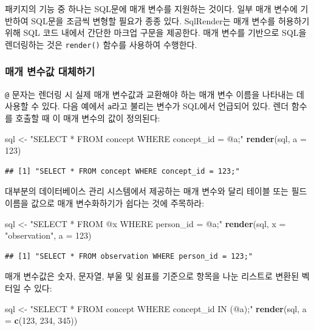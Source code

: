 \documentclass[10.5pt]{book}
\newenvironment{Shaded}{\begin{snugshade}}{\end{snugshade}}
\newcommand{\KeywordTok}[1]{\textcolor[rgb]{0.13,0.29,0.53}{\textbf{#1}}}
\newcommand{\DataTypeTok}[1]{\textcolor[rgb]{0.13,0.29,0.53}{#1}}
\newcommand{\DecValTok}[1]{\textcolor[rgb]{0.00,0.00,0.81}{#1}}
\newcommand{\StringTok}[1]{\textcolor[rgb]{0.31,0.60,0.02}{#1}}
\newcommand{\NormalTok}[1]{#1}
\theoremstyle{definition}
\theoremstyle{definition}
\theoremstyle{definition}
\theoremstyle{remark}
\begin{document}
패키지의 기능 중 하나는 SQL문에 매개 변수를 지원하는 것이다. 일부 매개
변수에 기반하여 SQL문을 조금씩 변형할 필요가 종종 있다. SqlRender는 매개
변수를 허용하기 위해 SQL 코드 내에서 간단한 마크업 구문을 제공한다. 매개
변수를 기반으로 SQL을 렌더링하는 것은 \texttt{render()} 함수를 사용하여
수행한다. 

\subsubsection*{매개 변수값 대체하기}\label{--}

\texttt{@} 문자는 렌더링 시 실제 매개 변수값과 교환해야 하는 매개 변수
이름을 나타내는 데 사용할 수 있다. 다음 예에서 \texttt{a}라고 불리는
변수가 SQL에서 언급되어 있다. 렌더 함수를 호출할 때 이 매개 변수의 값이
정의된다:

\begin{Shaded}
\begin{Highlighting}[]
\NormalTok{sql <-}\StringTok{ "SELECT * FROM concept WHERE concept_id = @a;"}
\KeywordTok{render}\NormalTok{(sql, }\DataTypeTok{a =} \DecValTok{123}\NormalTok{)}
\end{Highlighting}
\end{Shaded}

\begin{verbatim}
## [1] "SELECT * FROM concept WHERE concept_id = 123;"
\end{verbatim}

대부분의 데이터베이스 관리 시스템에서 제공하는 매개 변수와 달리 테이블
또는 필드 이름을 값으로 매개 변수화하기가 쉽다는 것에 주목하라:

\begin{Shaded}
\begin{Highlighting}[]
\NormalTok{sql <-}\StringTok{ "SELECT * FROM @x WHERE person_id = @a;"}
\KeywordTok{render}\NormalTok{(sql, }\DataTypeTok{x =} \StringTok{"observation"}\NormalTok{, }\DataTypeTok{a =} \DecValTok{123}\NormalTok{)}
\end{Highlighting}
\end{Shaded}

\begin{verbatim}
## [1] "SELECT * FROM observation WHERE person_id = 123;"
\end{verbatim}

매개 변수값은 숫자, 문자열, 부울 및 쉼표를 기준으로 항목을 나눈 리스트로
변환된 벡터일 수 있다:

\begin{Shaded}
\begin{Highlighting}[]
\NormalTok{sql <-}\StringTok{ "SELECT * FROM concept WHERE concept_id IN (@a);"}
\KeywordTok{render}\NormalTok{(sql, }\DataTypeTok{a =} \KeywordTok{c}\NormalTok{(}\DecValTok{123}\NormalTok{, }\DecValTok{234}\NormalTok{, }\DecValTok{345}\NormalTok{))}
\end{Highlighting}
\end{Shaded}
\end{document}
